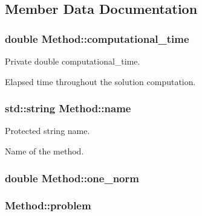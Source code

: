 \subsection{Member Data Documentation}
\subsubsection[{\texorpdfstring{computational\+\_\+time}{computational_time}}]{\setlength{\rightskip}{0pt plus 5cm}double Method\+::computational\+\_\+time\hspace{0.3cm}{\ttfamily [private]}}\hypertarget{classMethod_a4504c8cdb13651c87485d76d6e20d7ef}{}\label{classMethod_a4504c8cdb13651c87485d76d6e20d7ef}


Private double computational\+\_\+time. 

Elapsed time throughout the solution computation. 
\subsubsection[{\texorpdfstring{name}{name}}]{\setlength{\rightskip}{0pt plus 5cm}std\+::string Method\+::name\hspace{0.3cm}{\ttfamily [protected]}}\hypertarget{classMethod_a8648aeee4e6ebb1adc52522ac26ac523}{}\label{classMethod_a8648aeee4e6ebb1adc52522ac26ac523}


Protected string name. 

Name of the method. 
\subsubsection[{\texorpdfstring{one\+\_\+norm}{one_norm}}]{\setlength{\rightskip}{0pt plus 5cm}double Method\+::one\+\_\+norm\hspace{0.3cm}{\ttfamily [private]}}\hypertarget{classMethod_a50dd2ba109ea6806d98f8ebe6bbaa743}{}\label{classMethod_a50dd2ba109ea6806d98f8ebe6bbaa743}
\subsubsection[{\texorpdfstring{problem}{problem}}]{ Method\+::problem\hspace{0.3cm}{\ttfamily [protected]}}\hypertarget{classMethod_a29a08a679b5d30a8c813766308205041}{}\label{classMethod_a29a08a679b5d30a8c813766308205041}


